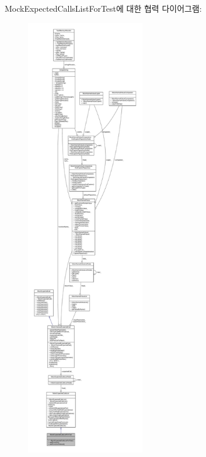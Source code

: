 Mock\+Expected\+Calls\+List\+For\+Test에 대한 협력 다이어그램\+:
\nopagebreak
\begin{figure}[H]
\begin{center}
\leavevmode
\includegraphics[height=550pt]{class_mock_expected_calls_list_for_test__coll__graph}
\end{center}
\end{figure}
